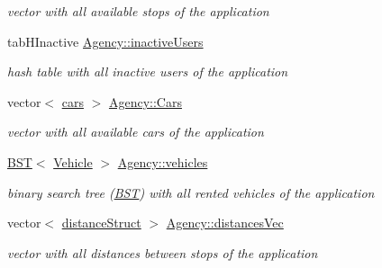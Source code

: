 \begin{DoxyCompactItemize}
\begin{DoxyCompactList}\small\item\em vector with all available stops of the application \end{DoxyCompactList}\item 
\mbox{\label{group___agency_ga4057f2249af0d7929b717f626c962aee}} 
tab\+H\+Inactive \hyperlink{group___agency_ga4057f2249af0d7929b717f626c962aee}{Agency\+::inactive\+Users}
\begin{DoxyCompactList}\small\item\em hash table with all inactive users of the application \end{DoxyCompactList}\item 
\mbox{\label{group___agency_ga2fc5f0f3c78faed2a20b3dbcf276a730}} 
vector$<$ \hyperlink{structcars}{cars} $>$ \hyperlink{group___agency_ga2fc5f0f3c78faed2a20b3dbcf276a730}{Agency\+::\+Cars}
\begin{DoxyCompactList}\small\item\em vector with all available cars of the application \end{DoxyCompactList}\item 
\mbox{\label{group___agency_gaacec2af5f5b458ab7103225e07b780cf}} 
\hyperlink{class_b_s_t}{B\+ST}$<$ \hyperlink{class_vehicle}{Vehicle} $>$ \hyperlink{group___agency_gaacec2af5f5b458ab7103225e07b780cf}{Agency\+::vehicles}
\begin{DoxyCompactList}\small\item\em binary search tree (\hyperlink{class_b_s_t}{B\+ST}) with all rented vehicles of the application \end{DoxyCompactList}\item 
\mbox{\label{group___agency_ga53eb5336f6197d5643f9489f2efc0467}} 
vector$<$ \hyperlink{structdistance_struct}{distance\+Struct} $>$ \hyperlink{group___agency_ga53eb5336f6197d5643f9489f2efc0467}{Agency\+::distances\+Vec}
\begin{DoxyCompactList}\small\item\em vector with all distances between stops of the application \end{DoxyCompactList}\end{DoxyCompactItemize}
